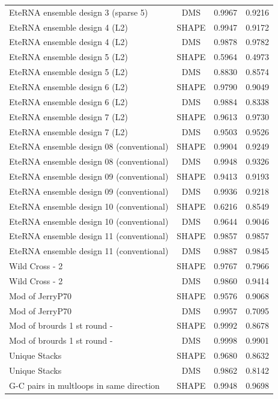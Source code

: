 \documentclass[letter]{bioinfo}
\begin{document}
\begin{center}
\begin{longtable}{lccc}
EteRNA ensemble design 3 (sparse 5)	&	DMS	&	0.9967 	&	0.9216 	\\
EteRNA ensemble design 4 (L2)	&	SHAPE	&	0.9947 	&	0.9172 	\\
EteRNA ensemble design 4 (L2)	&	DMS	&	0.9878 	&	0.9782 	\\
EteRNA ensemble design 5 (L2)	&	SHAPE	&	0.5964 	&	0.4973 	\\
EteRNA ensemble design 5 (L2)	&	DMS	&	0.8830 	&	0.8574 	\\
EteRNA ensemble design 6 (L2)	&	SHAPE	&	0.9790 	&	0.9049 	\\
EteRNA ensemble design 6 (L2)	&	DMS	&	0.9884 	&	0.8338 	\\
EteRNA ensemble design 7 (L2)	&	SHAPE	&	0.9613 	&	0.9730 	\\
EteRNA ensemble design 7 (L2)	&	DMS	&	0.9503 	&	0.9526 	\\
EteRNA ensemble design 08 (conventional)	&	SHAPE	&	0.9904 	&	0.9249 	\\
EteRNA ensemble design 08 (conventional)	&	DMS	&	0.9948 	&	0.9326 	\\
EteRNA ensemble design 09 (conventional)	&	SHAPE	&	0.9413 	&	0.9193 	\\
EteRNA ensemble design 09 (conventional)	&	DMS	&	0.9936 	&	0.9218 	\\
EteRNA ensemble design 10 (conventional)	&	SHAPE	&	0.6216 	&	0.8549 	\\
EteRNA ensemble design 10 (conventional)	&	DMS	&	0.9644 	&	0.9046 	\\
EteRNA ensemble design 11 (conventional)	&	SHAPE	&	0.9857 	&	0.9857 	\\
EteRNA ensemble design 11 (conventional)	&	DMS	&	0.9887 	&	0.9845 	\\
Wild Cross - 2	&	SHAPE	&	0.9767 	&	0.7966 	\\
Wild Cross - 2	&	DMS	&	0.9860 	&	0.9414 	\\
Mod of JerryP70	&	SHAPE	&	0.9576 	&	0.9068 	\\
Mod of JerryP70	&	DMS	&	0.9957 	&	0.7095 	\\
Mod of brourds 1 st round -	&	SHAPE	&	0.9992 	&	0.8678 	\\
Mod of brourds 1 st round -	&	DMS	&	0.9998 	&	0.9901 	\\
Unique Stacks	&	SHAPE	&	0.9680 	&	0.8632 	\\
Unique Stacks	&	DMS	&	0.9862 	&	0.8142 	\\
G-C pairs in multloops in same direction	&	SHAPE	&	0.9948 	&	0.9698 	\\

\end{longtable}
\end{center}
\end{document}

